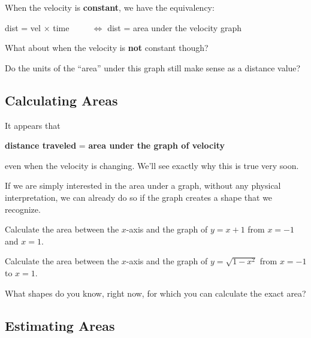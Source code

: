 \newpage

When the velocity is {\bf constant}, we have the equivalency:
\vspace{0.2in}
\begin{center}
dist = vel $\times$ time ~~~~ $\Longleftrightarrow$ dist = area under the velocity graph
\end{center}
\vspace{0.2in}

\problem 
What about when the velocity is {\bf not} constant though?

\begin{center}
\end{center}

Do the units of the ``area'' under this graph still make sense as a
distance value?


\vfill
\newpage
\subsection*{Calculating Areas}

It appears that
\begin{center}
  
{\bf distance traveled} = {\bf area under the graph of velocity}
\end{center}
even when the velocity is changing. We'll see exactly why this is true
very soon.

If we are simply interested in the area under a graph, without any
physical interpretation, we can already do so if the graph creates a
shape that we recognize.
\newpage

\problem Calculate the area between the $x$-axis and the graph of $y = x+1$ from $x=-1$ and $x=1$.

\hfill %
\newpage

\problem Calculate the area between the $x$-axis 
and the graph of $y = \sqrt{1 - x^{2}}$ from $x = -1$ to $x = 1$.

\hfill %

\vfill

\problem What shapes do you know, right now, for which you can
calculate the exact area?

\vfill

\newpage

\subsection*{Estimating Areas}

